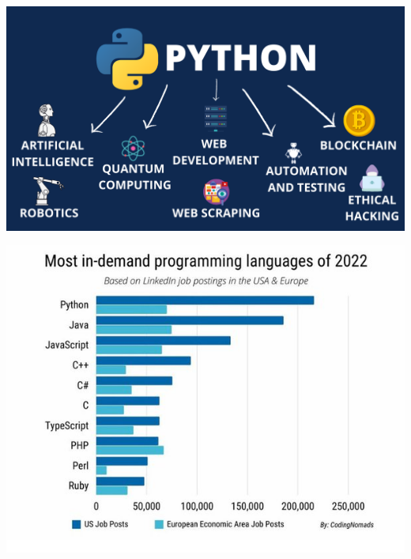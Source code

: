 \begin{frame}

 \begin{center}
    \includegraphics[scale=0.25]{img/why_python.png}
 \end{center}

\end{frame}
\begin{frame}

 \begin{center}
    \includegraphics[scale=0.5]{img/most_demand.jpeg}
 \end{center}

\end{frame}
